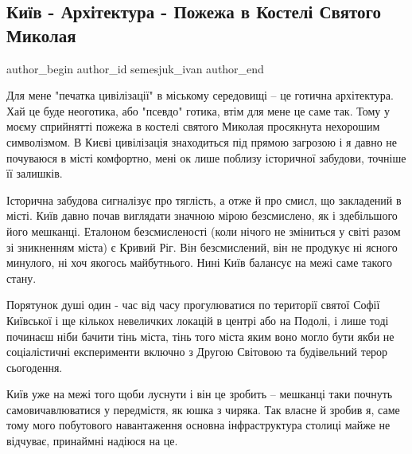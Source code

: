  
 
 
 
 
 
\subsection{Київ - Архітектура - Пожежа в Костелі Святого Миколая}
\label{sec:06_09_2021.fb.semesjuk_ivan.1.kiev_pozhar_kostel_arhitektura}
 
\ifcmt
 author_begin
   author_id semesjuk_ivan
 author_end
\fi

Для мене "печатка цивілізації" в міському середовищі – це готична архітектура.
Хай це буде неоготика, або "псевдо" готика, втім для мене це саме так. Тому у
моєму сприйнятті пожежа в костелі святого Миколая просякнута нехорошим
символізмом. В Києві цивілізація знаходиться під прямою загрозою і я давно не
почуваюся в місті комфортно, мені ок лише поблизу історичної забудови, точніше
її залишків. 

Історична забудова сигналізує про тяглість, а отже й про смисл, що закладений в
місті. Київ давно почав виглядати значною мірою безсмислено, як і здебільшого
його мешканці. Еталоном безсмисленості (коли нічого не зміниться у світі разом
зі зникненням міста) є Кривий Ріг. Він безсмислений, він не продукує ні ясного
минулого, ні хоч якогось майбутнього. Нині Київ балансує на межі саме такого
стану. 

Порятунок душі один - час від часу прогулюватися по території святої Софії
Київської і ще кількох невеличких локацій в центрі або на Подолі, і лише тоді
починаєш ніби бачити тінь міста, тінь того міста яким воно могло бути якби не
соціалістичні експерименти включно з Другою Світовою та  будівельний терор
сьогодення. 

Київ уже на межі того щоби луснути і він це зробить – мешканці таки почнуть
самовичавлюватися у передмістя, як юшка з чиряка. Так власне й зробив я, саме
тому мого побутового навантаження основна інфраструктура столиці майже не
відчуває, принаймні надіюся на це.

